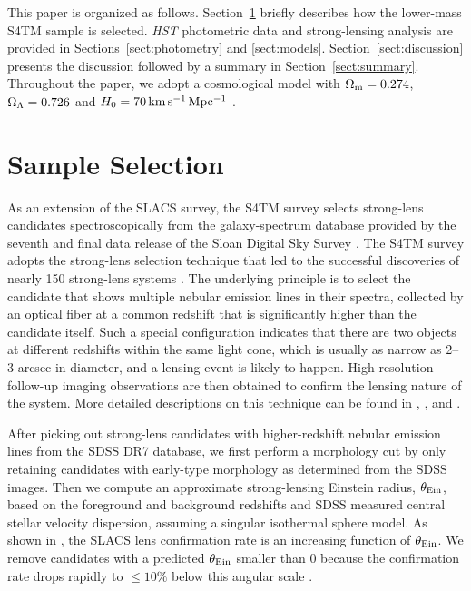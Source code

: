 \documentclass{emulateapj}
\begin{document}
This paper is organized as follows. Section~\ref{sect:sample} briefly describes how the 
lower-mass S4TM sample is selected. \textsl{HST} photometric data and strong-lensing analysis 
are provided in Sections~\ref{sect:photometry} and \ref{sect:models}. 
Section~\ref{sect:discussion} presents the discussion followed by a summary in 
Section~\ref{sect:summary}. Throughout the paper, 
we adopt a cosmological model with $\rm \Omega_m = 0.274$, 
$\rm \Omega_{\Lambda} = 0.726$ and $H_0 \rm = 70\,km\,s^{-1}\,Mpc^{-1}$ 
\citep[WMAP7;][]{WMAP7}.


\section{Sample Selection}
\label{sect:sample}

As an extension of the SLACS survey, the S4TM survey selects 
strong-lens candidates spectroscopically from the galaxy-spectrum database provided 
by the seventh and final data release of the Sloan Digital Sky Survey \citep[SDSS;][]{DR7}. 
The S4TM survey adopts the strong-lens selection technique 
that led to the successful discoveries of nearly 150 strong-lens systems 
\citep[e.g.,][]{SLACSV, SLACSIX, SWELLSI, Brewer12, Brownstein12, BELLS_IV, Rui17}. 
The underlying principle is to select the candidate that shows multiple nebular emission 
lines in their spectra, collected by an optical fiber at a common redshift that is 
significantly higher than the candidate itself. Such a special configuration indicates 
that there are two objects at different redshifts within the same light cone, which is 
usually as narrow as 2--3 arcsec in diameter, and a lensing event is likely to 
happen. High-resolution follow-up imaging observations are then obtained to confirm 
the lensing nature of the system. 
More detailed descriptions on this technique can be found in 
\citet{Bolton04}, \citet{Brownstein12}, and \citet{BELLS_IV}. 

After picking out strong-lens candidates with higher-redshift nebular emission lines 
from the SDSS DR7 database, we first perform a morphology cut by only retaining candidates 
with early-type morphology as determined from the SDSS images. Then we compute an approximate 
strong-lensing Einstein radius, $\theta_{\rm Ein}$, based on the foreground and background 
redshifts and SDSS measured central stellar velocity dispersion, assuming a singular 
isothermal sphere model. As shown in \citet{SLACSV}, the SLACS lens confirmation 
rate is an increasing function of $\theta_{\rm Ein}$. We remove candidates with 
a predicted $\theta_{\rm Ein}$ smaller than 0 because the confirmation rate drops 
rapidly to $\leqslant 10\%$ below this angular scale \citep{SLACSV}. 
\end{document}
